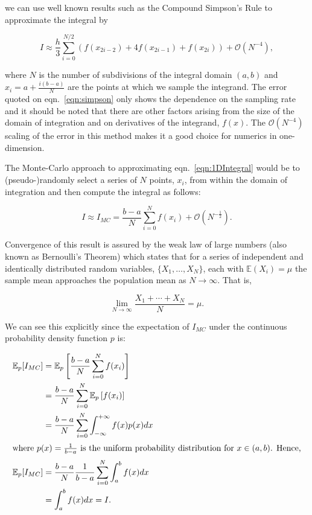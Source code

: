	we can use well known results such as the Compound Simpson's Rule to approximate the integral by

	\begin{equation}
		I \approx \frac{h}{3}\sum_{i=0}^{N/2}\left(f(x_{2i-2}) + 4f(x_{2i-1}) + f(x_{2i})\right) + \mathcal{O}(N^{-4}),
		\label{eqn:simpson}
	\end{equation}

	where $N$ is the number of subdivisions of the integral domain $(a, b)$ and $x_i = a + \frac{i(b-a)}{N}$ are the points at which we sample the integrand.
	The error quoted on eqn.~\eqref{eqn:simpson} only shows the dependence on the sampling rate and it should be noted that there are other factors arising
	from the size of the domain of integration and on derivatives of the integrand, $f(x)$.  The $\mathcal{O}(N^{-4})$ scaling of the error in this method makes it a good choice
	for numerics in one-dimension.

	The Monte-Carlo approach to approximating eqn.~\eqref{eqn:1DIntegral} would be to (pseudo-)randomly select a series of $N$ points, $x_i$, from within the domain of integration
	and then compute the integral as follows:

	\begin{equation}
		I \approx I_{MC} = \frac{b-a}{N}\sum_{i=0}^{N}f(x_i) + \mathcal{O}(N^{-\frac{1}{2}}).
	\end{equation}

	Convergence of this result is assured by the weak law of large numbers (also known as Bernoulli's Theorem) which states that for a series of
	independent and identically distributed random variables, $\{X_1,\ldots,X_N\}$, each with $\mathbb{E}(X_i) = \mu$ the sample mean approaches the population mean as $N\rightarrow\infty$.
	That is,

	\begin{equation}
		\lim_{N\rightarrow\infty}\frac{X_1+\cdots+X_N}{N}=\mu.
	\end{equation}

	We can see this explicitly since the expectation of $I_{MC}$ under the continuous probability density function $p$ is:

	\begin{align*}
		\mathbb{E}_p[I_{MC}] &= \mathbb{E}_p\left[\frac{b-a}{N}\sum_{i=0}^{N}f(x_i)\right]    \\
		                     &= \frac{b-a}{N}\sum_{i=0}^{N}\mathbb{E}_p\left[f(x_i)\right]    \\
		                     &= \frac{b-a}{N}\sum_{i=0}^{N}\int_{-\infty}^{+\infty}f(x)p(x)dx \\
		                     \intertext{where $p(x)=\frac{1}{b-a}$ is the uniform probability distribution for $x\in(a, b)$.  Hence,}
		\mathbb{E}_p[I_{MC}] &= \frac{b-a}{N}\frac{1}{b-a}\sum_{i=0}^{N}\int_{a}^{b}f(x)dx \\
		                     &= \int_{a}^{b}f(x)dx = I.
	\end{align*}

